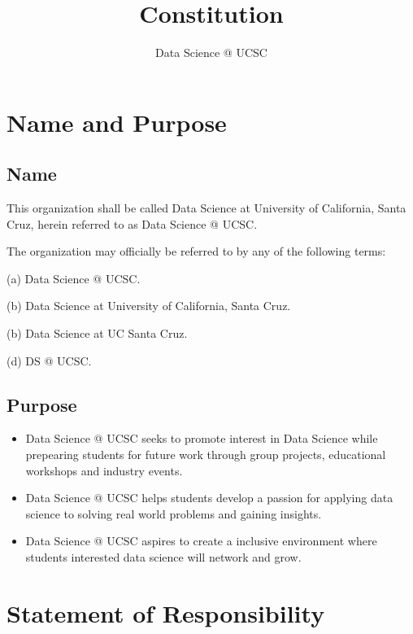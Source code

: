 \documentclass{article}
\title{Constitution}
\author{Data Science @ UCSC}
\newcommand{\SubItem}[1]{
    {\setlength\itemindent{15pt} \item[] #1}
}
\begin{document}
\maketitle
\tableofcontents

\newpage

\section{Name and Purpose}

\subsection{Name}
\begin{itemize}
    \item[1.] This organization shall be called Data Science at University of California, Santa Cruz, herein referred to as Data Science @ UCSC.
    \item[2.]  The organization may officially be referred to by any of the following terms:
    \SubItem{} (a) Data Science @ UCSC.
    \SubItem{} (b) Data Science at University of California, Santa Cruz.
    \SubItem{} (b) Data Science at UC Santa Cruz.
    \SubItem{} (d) DS @ UCSC.
    \item[]
\end{itemize}

\subsection{Purpose}
\begin{itemize}
    \item[1.] Data Science @ UCSC seeks to promote interest in Data Science
    while prepearing students for future work through group projects, educational workshops and industry events.
    \item[2.] Data Science @ UCSC helps students develop a passion for applying data science to solving real world problems and gaining insights.
    \item[3.] Data Science @ UCSC aspires to create a inclusive environment where students interested data science will network and grow.
\end{itemize}


\section{Statement of Responsibility}
\end{document}
